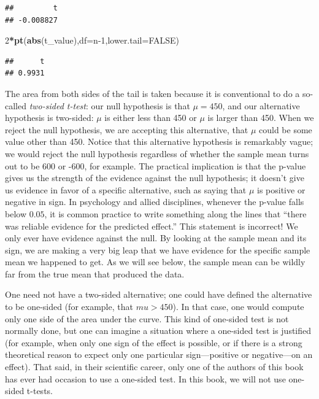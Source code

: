 \documentclass[12pt,]{krantz}
\newenvironment{Shaded}{\begin{snugshade}}{\end{snugshade}}
\newcommand{\DataTypeTok}[1]{\textcolor[rgb]{0.13,0.29,0.53}{#1}}
\newcommand{\DecValTok}[1]{\textcolor[rgb]{0.00,0.00,0.81}{#1}}
\newcommand{\KeywordTok}[1]{\textcolor[rgb]{0.13,0.29,0.53}{\textbf{#1}}}
\newcommand{\NormalTok}[1]{#1}
\newcommand{\OperatorTok}[1]{\textcolor[rgb]{0.81,0.36,0.00}{\textbf{#1}}}
\newcommand{\OtherTok}[1]{\textcolor[rgb]{0.56,0.35,0.01}{#1}}
\begin{document}
\begin{verbatim}
##         t 
## -0.008827
\end{verbatim}

\begin{Shaded}
\begin{Highlighting}[]
\DecValTok{2}\OperatorTok{*}\KeywordTok{pt}\NormalTok{(}\KeywordTok{abs}\NormalTok{(t_value),}\DataTypeTok{df=}\NormalTok{n}\DecValTok{-1}\NormalTok{,}\DataTypeTok{lower.tail=}\OtherTok{FALSE}\NormalTok{)}
\end{Highlighting}
\end{Shaded}

\begin{verbatim}
##      t 
## 0.9931
\end{verbatim}

The area from both sides of the tail is taken because it is conventional to do a so-called \emph{two-sided t-test}: our null hypothesis is that \(\mu=450\), and our alternative hypothesis is two-sided: \(\mu\) is either less than 450 or \(\mu\) is larger than 450. When we reject the null hypothesis, we are accepting this alternative, that \(\mu\) could be some value other than 450. Notice that this alternative hypothesis is remarkably vague; we would reject the null hypothesis regardless of whether the sample mean turns out to be 600 or -600, for example. The practical implication is that the p-value gives us the strength of the evidence against the null hypothesis; it doesn't give us evidence in favor of a specific alternative, such as saying that \(\mu\) is positive or negative in sign. In psychology and allied disciplines, whenever the p-value falls below \(0.05\), it is common practice to write something along the lines that ``there was reliable evidence for the predicted effect.'' This statement is incorrect! We only ever have evidence against the null. By looking at the sample mean and its sign, we are making a very big leap that we have evidence for the specific sample mean we happened to get. As we will see below, the sample mean can be wildly far from the true mean that produced the data.

One need not have a two-sided alternative; one could have defined the alternative to be one-sided (for example, that \(mu>450\)). In that case, one would compute only one side of the area under the curve. This kind of one-sided test is not normally done, but one can imagine a situation where a one-sided test is justified (for example, when only one sign of the effect is possible, or if there is a strong theoretical reason to expect only one particular sign---positive or negative---on an effect). That said, in their scientific career, only one of the authors of this book has ever had occasion to use a one-sided test. In this book, we will not use one-sided t-tests.
\end{document}
